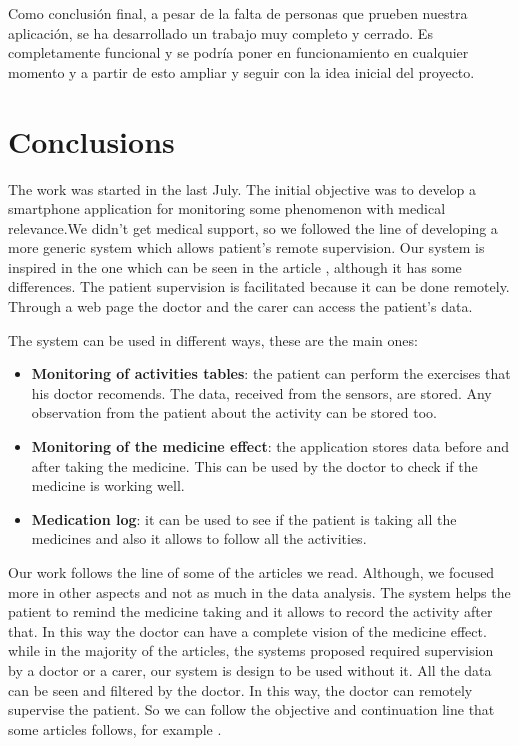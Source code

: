 \documentclass[11pt,spanish]{article}
\begin{document}
Como conclusión final, a pesar de la falta de personas que prueben nuestra aplicación, se ha desarrollado un trabajo muy completo y cerrado. Es completamente funcional y se podría poner en funcionamiento en cualquier momento y a partir de esto ampliar y seguir con la idea inicial del proyecto.
\newpage

\section{Conclusions}

The work was started in the last July. The initial objective was to develop a smartphone application for monitoring some phenomenon with medical relevance.We didn’t get medical support, so we followed the line of developing a more generic system which allows patient’s remote supervision. Our system is inspired in the one which can be seen in the article \cite{resumen1}, although it has some differences. The patient supervision is facilitated because it can be done remotely. Through a web page the doctor and the carer can access the patient’s data.
\newline

The system can be used in different ways, these are the main ones:

\begin{itemize}
	\item {\bf Monitoring of activities tables}: the patient can perform the exercises that his doctor recomends. The data, received from the sensors, are stored. Any observation from the patient about the activity can be stored too.
	\item {\bf Monitoring of the medicine effect}: the application stores data before and after taking the medicine. This can be used by the doctor to check if the medicine is working well.
	\item {\bf Medication log}: it can be used to see if the patient is taking all the medicines and also it allows to follow all the activities. 
\end{itemize}

Our work follows the line of some of the articles we read. Although, we focused more in other aspects and not as much in the data analysis. The system helps the patient to remind the medicine taking and it allows to record the activity after that. In this way the doctor can have a complete vision of the medicine effect. while in the majority of the articles, the systems proposed required supervision by a doctor or a carer, our system is design to be used without it. All the data can be seen and filtered by the doctor. In this way, the doctor can remotely supervise the patient. So we can follow the objective and continuation line that some articles follows, for example \cite {resumen2}.
\newline
\end{document}
